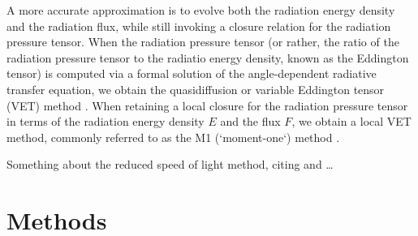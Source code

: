 \documentclass[fleqn,usenatbib]{mnras}
\begin{document}
A more accurate approximation is to evolve both the radiation energy density and the radiation flux, while still invoking a closure relation for the radiation pressure tensor. When the radiation pressure tensor (or rather, the ratio of the radiation pressure tensor to the radiatio energy density, known as the Eddington tensor) is computed via a formal solution of the angle-dependent radiative transfer equation, we obtain the quasidiffusion or variable Eddington tensor (VET) method \citep{Goldin_1964}. When retaining a local closure for the radiation pressure tensor in terms of the radiation energy density $E$ and the flux $F$, we obtain a local VET method, commonly referred to as the M1 (`moment-one`) method \citep{Minerbo_1978,Levermore_1984,Dubroca_1999,Gonzalez_2007}.

Something about the reduced speed of light method, citing \cite{Gnedin_2001} and \cite{Skinner_2013}\dots

\section{Methods}
\label{section:methods}
\end{document}
